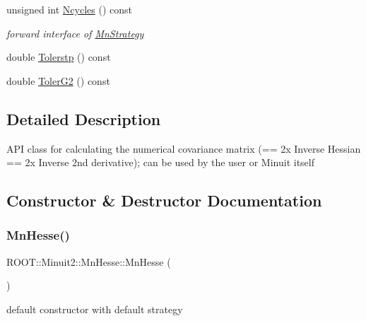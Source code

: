 \begin{DoxyCompactItemize}
\item 
unsigned int \mbox{\hyperlink{classROOT_1_1Minuit2_1_1MnHesse_a5a84b9459469f2edf55f28d8d579a00d}{Ncycles}} () const
\begin{DoxyCompactList}\small\item\em forward interface of \mbox{\hyperlink{classROOT_1_1Minuit2_1_1MnStrategy}{Mn\+Strategy}} \end{DoxyCompactList}\item 
double \mbox{\hyperlink{classROOT_1_1Minuit2_1_1MnHesse_a4b36474a0d157ecb634bbf5d120db669}{Tolerstp}} () const
\item 
double \mbox{\hyperlink{classROOT_1_1Minuit2_1_1MnHesse_ae625b94360c1c974854b63aedbcc6a1a}{Toler\+G2}} () const
\end{DoxyCompactItemize}


\subsection{Detailed Description}
A\+PI class for calculating the numerical covariance matrix (== 2x Inverse Hessian == 2x Inverse 2nd derivative); can be used by the user or Minuit itself 

\subsection{Constructor \& Destructor Documentation}
\mbox{\label{classROOT_1_1Minuit2_1_1MnHesse_a3be9ef44f3e8808dbd225df9a22aeab8}} 
\subsubsection{\texorpdfstring{MnHesse()}{MnHesse()}\hspace{0.1cm}{\footnotesize\ttfamily [1/6]}}
{\footnotesize\ttfamily R\+O\+O\+T\+::\+Minuit2\+::\+Mn\+Hesse\+::\+Mn\+Hesse (\begin{DoxyParamCaption}{ }\end{DoxyParamCaption})\hspace{0.3cm}{\ttfamily [inline]}}



default constructor with default strategy 

\mbox{\label{classROOT_1_1Minuit2_1_1MnHesse_ad68578086b8b53c029be88acdfe5ec62}} 
